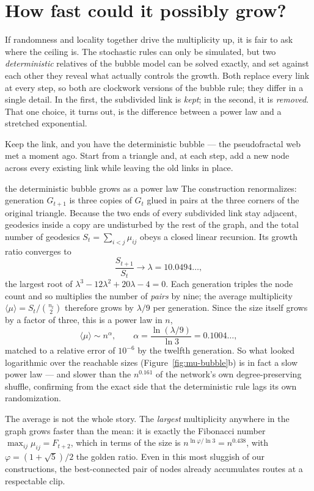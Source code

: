 \section{How fast could it possibly grow?}
\label{sec:mu-exact}

If randomness and locality together drive the multiplicity up, it is fair to ask
where the ceiling is. The stochastic rules can only be simulated, but two
\emph{deterministic} relatives of the bubble model can be solved exactly, and set
against each other they reveal what actually controls the growth. Both replace
every link at every step, so both are clockwork versions of the bubble rule; they
differ in a single detail. In the first, the subdivided link is \emph{kept}; in the
second, it is \emph{removed}. That one choice, it turns out, is the difference
between a power law and a stretched exponential.

Keep the link, and you have the deterministic bubble --- the pseudofractal web met
a moment ago. Start from a triangle and, at each step, add a new node across every
existing link while leaving the old links in place.

\begin{calculation}{the deterministic bubble grows as a power law}
The construction renormalizes: generation $G_{t+1}$ is three copies of $G_t$ glued
in pairs at the three corners of the original triangle. Because the two ends of
every subdivided link stay adjacent, geodesics inside a copy are undisturbed by the
rest of the graph, and the total number of geodesics $S_t=\sum_{i<j}\mu_{ij}$ obeys
a closed linear recursion. Its growth ratio converges to
\begin{equation}
  \frac{S_{t+1}}{S_t}\longrightarrow \lambda = 10.0494\ldots,
  \label{eq:bbd-lambda}
\end{equation}
the largest root of $\lambda^3-12\lambda^2+20\lambda-4=0$. Each generation triples
the node count and so multiplies the number of \emph{pairs} by nine; the average
multiplicity $\langle\mu\rangle=S_t/\binom{n_t}{2}$ therefore grows by $\lambda/9$
per generation. Since the size itself grows by a factor of three, this is a power
law in $n$,
\begin{equation}
  \langle\mu\rangle \sim n^{\alpha}, \qquad
  \alpha = \frac{\ln(\lambda/9)}{\ln 3} = 0.1004\ldots,
  \label{eq:bbd-alpha}
\end{equation}
matched to a relative error of $10^{-6}$ by the twelfth generation. So what looked
logarithmic over the reachable sizes (Figure~\ref{fig:mu-bubble}b) is in fact a
slow power law --- and slower than the $n^{0.161}$ of the network's own
degree-preserving shuffle, confirming from the exact side that the deterministic
rule lags its own randomization.

The average is not the whole story. The \emph{largest} multiplicity anywhere in
the graph grows faster than the mean: it is exactly the Fibonacci number
$\max_{ij}\mu_{ij}=F_{t+2}$, which in terms of the size is
$n^{\ln\varphi/\ln 3}=n^{0.438}$, with $\varphi=(1+\sqrt5)/2$ the golden ratio.
Even in this most sluggish of our constructions, the best-connected pair of nodes
already accumulates routes at a respectable clip.
\end{calculation}

